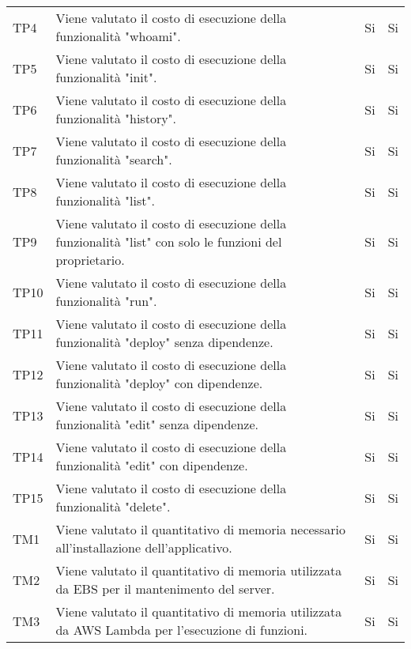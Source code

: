 \begin{longtable}{
		>{\centering}p{}
		>{}p{}
		>{\centering}p{}
		>{\centering}p{} }
		TP4 & Viene valutato il costo di esecuzione della funzionalità "whoami". &
		Si &
		Si \tabularnewline
		
		TP5 & Viene valutato il costo di esecuzione della funzionalità "init". &
		Si &
		Si \tabularnewline
		
		TP6 & Viene valutato il costo di esecuzione della funzionalità "history". &
		Si &
		Si \tabularnewline
		
		TP7 & Viene valutato il costo di esecuzione della funzionalità "search". &
		Si &
		Si \tabularnewline
		
		TP8 & Viene valutato il costo di esecuzione della funzionalità "list". &
		Si &
		Si \tabularnewline
		
		TP9 & Viene valutato il costo di esecuzione della funzionalità "list" con solo le funzioni del proprietario. &
		Si &
		Si \tabularnewline
		
		TP10 & Viene valutato il costo di esecuzione della funzionalità "run". &
		Si &
		Si \tabularnewline
		
		TP11 & Viene valutato il costo di esecuzione della funzionalità "deploy\ped{\textit{G}}" senza dipendenze. &
		Si &
		Si \tabularnewline
		
		TP12 & Viene valutato il costo di esecuzione della funzionalità "deploy\ped{\textit{G}}" con dipendenze. &
		Si &
		Si \tabularnewline
		
		TP13 & Viene valutato il costo di esecuzione della funzionalità "edit" senza dipendenze. &
		Si &
		Si \tabularnewline
		
		TP14 & Viene valutato il costo di esecuzione della funzionalità "edit" con dipendenze. &
		Si &
		Si \tabularnewline
		
		TP15 & Viene valutato il costo di esecuzione della funzionalità "delete". &
		Si &
		Si \tabularnewline
		
		
		
		
		
		
		
		TM1 & Viene valutato il quantitativo di memoria necessario all'installazione dell'applicativo. &
		Si &
		Si \tabularnewline
		
		TM2 & Viene valutato il quantitativo di memoria utilizzata da EBS per il mantenimento del server. &
		Si &
		Si \tabularnewline
		
		TM3 & Viene valutato il quantitativo di memoria utilizzata da AWS Lambda\ped{\textit{G}} per l'esecuzione di funzioni. &
		Si &
		Si \tabularnewline
		





\end{longtable}
